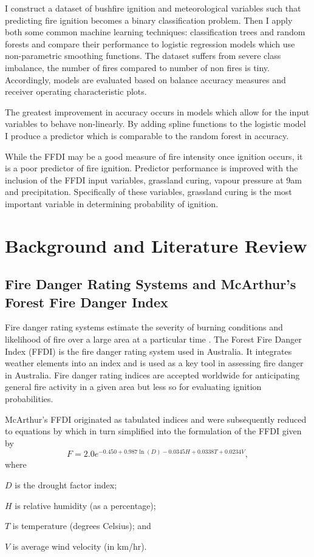 \documentclass[11pt,a4paper]{article}
\begin{document}
I construct a dataset of bushfire ignition and meteorological variables such that predicting fire ignition becomes a binary classification problem. Then I apply both some common machine learning techniques: classification trees and random forests and compare their performance to logistic regression models which use non-parametric smoothing functions. The dataset suffers from severe class imbalance, the number of fires compared to number of non fires is tiny. Accordingly, models are evaluated based on balance accuracy measures and receiver operating characteristic plots.

The greatest improvement in accuracy occurs in models which allow for the input variables to behave non-linearly. By adding spline functions to the logistic model I produce a predictor which is comparable to the random forest in accuracy.

While the FFDI may be a good measure of fire intensity once ignition occurs, it is a poor predictor of fire ignition. Predictor performance is improved with the inclusion of the FFDI input variables, grassland curing, vapour pressure at 9am and precipitation. Specifically of these variables, grassland curing is the most important variable in determining probability of ignition.


\section{Background and Literature Review}

\subsection{Fire Danger Rating Systems and McArthur's Forest Fire Danger Index}
Fire danger rating systems estimate the severity of burning conditions and likelihood of fire over a large area at a particular time \citep{chandler83, andrews03}. The Forest Fire Danger Index (FFDI) \citep{mcarthur67} is the fire danger rating system used in Australia. It integrates weather elements into an index and is used as a key tool in assessing fire danger in Australia. Fire danger rating indices are accepted worldwide for anticipating general fire activity in a given area but less so for evaluating ignition probabilities.

McArthur's FFDI originated as tabulated indices and were subsequently reduced to equations by \citet{noble80} which in turn simplified into the formulation of the FFDI given by
\begin{equation}
  \label{eq FFDI}
  F=2.0 e^{-0.450 + 0.987 \ln(D)-0.0345H+0.0338T+0.0234V},
\end{equation}
where
\begin{compactitem}
  \item $D$ is the drought factor index;
  \item $H$ is relative humidity (as a percentage);
  \item $T$ is temperature (degrees Celsius); and
  \item $V$ is average wind velocity (in km/hr).
\end{compactitem}
\end{document}
